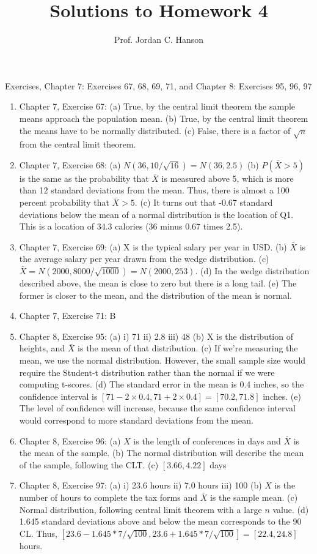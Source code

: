 \documentclass{article}
\begin{document}
\title{Solutions to Homework 4}
\author{Prof. Jordan C. Hanson}

\maketitle

Exercises, Chapter 7: Exercises 67, 68, 69, 71, and Chapter 8: Exercises 95, 96, 97

\begin{enumerate}
\item Chapter 7, Exercise 67: (a) True, by the central limit theorem the sample means approach the population mean. (b) True, by the central limit theorem the means have to be normally distributed. (c) False, there is a factor of $\sqrt{n}$ from the central limit theorem.
\item Chapter 7, Exercise 68: (a) $N(36,10/\sqrt{16}) = N(36,2.5)$ (b) $P(\bar{X} > 5)$ is the same as the probability that $\bar{X}$ is measured above 5, which is more than 12 standard deviations from the mean.  Thus, there is almost a 100 percent probability that $\bar{X} > 5$. (c) It turns out that -0.67 standard deviations below the mean of a normal distribution is the location of Q1.  This is a location of 34.3 calories (36 minus 0.67 times 2.5).
\item Chapter 7, Exercise 69: (a) X is the typical salary per year in USD. (b) $\bar{X}$ is the average salary per year drawn from the wedge distribution. (c) $\bar{X} = N(2000,8000/\sqrt{1000}) = N(2000,253)$. (d) In the wedge distribution described above, the mean is close to zero but there is a long tail. (e) The former is closer to the mean, and the distribution of the mean is normal.
\item Chapter 7, Exercise 71: B 
\item Chapter 8, Exercise 95: (a) i) 71 ii) 2.8 iii) 48 (b) X is the distribution of heights, and $\bar{X}$ is the mean of that distribution. (c) If we're measuring the mean, we use the normal distribution.  However, the small sample size would require the Student-t distribution rather than the normal if we were computing t-scores. (d) The standard error in the mean is 0.4 inches, so the confidence interval is $[71 - 2 \times 0.4, 71 + 2\times 0.4] = [70.2, 71.8]$ inches. (e) The level of confidence will increase, because the same confidence interval would correspond to more standard deviations from the mean.
\item Chapter 8, Exercise 96: (a) $X$ is the length of conferences in days and $\bar{X}$ is the mean of the sample. (b) The normal distribution will describe the mean of the sample, following the CLT. (c) $[3.66,4.22]$ days
\item Chapter 8, Exercise 97: (a) i) 23.6 hours ii) 7.0 hours iii) 100 (b) $X$ is the number of hours to complete the tax forms and $\bar{X}$ is the sample mean. (c) Normal distribution, following central limit theorem with a large $n$ value. (d) 1.645 standard deviations above and below the mean corresponds to the 90 CL.  Thus, $[23.6-1.645*7/\sqrt{100}, 23.6+1.645*7/\sqrt{100}] = [22.4, 24.8]$ hours.
\end{enumerate}
\end{document}
